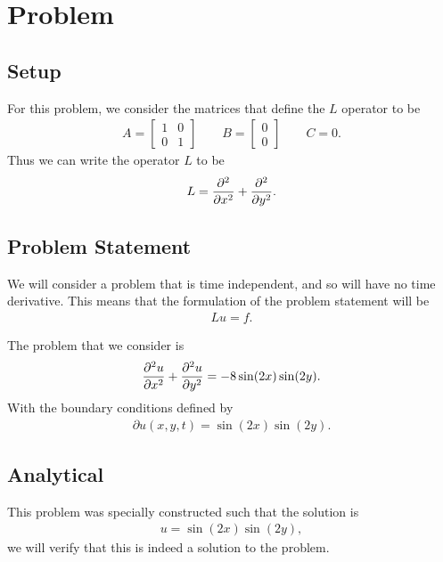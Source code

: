\documentclass[../fem.tex]{subfile}
\begin{document}
\section{Problem}%
\label{sec:problem}

\subsection{Setup}%
\label{sub:setup}

For this problem, we consider the matrices that define the $L$ operator to be
\begin{align*}
  A=\begin{bmatrix}
    1 & 0\\ 0 & 1
  \end{bmatrix}\qquad
  B=\begin{bmatrix}
    0 \\ 0
  \end{bmatrix}\qquad
  C=0.
\end{align*}
Thus we can write the operator $L$ to be
\begin{align*}
  L=\frac{\partial^2 }{\partial {x}^2}+\frac{\partial^2 }{\partial {y}^2}.
\end{align*}

\subsection{Problem Statement}%
\label{sub:problem_statement}

We will consider a problem that is time independent, and so will have no time
derivative. This means that the formulation of the problem statement will be
\begin{align*}
  Lu=f.
\end{align*}

The problem that we consider is
\begin{align}
  \frac{\partial^2 u}{\partial {x}^2}+\frac{\partial^2 u}{\partial {y}^2}=-8\sin(2x)\sin(2y).
\end{align}
With the boundary conditions defined by
\begin{align*}
  \partial u(x, y, t)=\sin(2x)\sin(2y).
\end{align*}

\subsection{Analytical}%
\label{sub:analytical}

This problem was specially constructed such that the solution is
\begin{align*}
  u=\sin(2x)\sin(2y),
\end{align*}
we will verify that this is indeed a solution to the problem.
\end{document}
